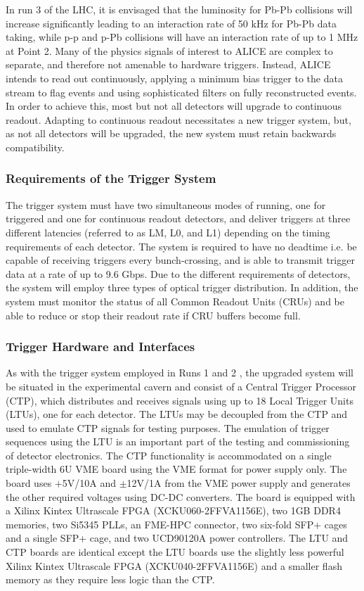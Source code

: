In run 3 of the LHC, it is envisaged that the luminosity for Pb-Pb collisions will increase significantly leading to an interaction rate of 50 kHz for Pb-Pb data taking, while p-p and p-Pb collisions will have an interaction rate of up to 1 MHz at Point 2. Many of the physics signals of interest to ALICE are complex to separate, and therefore not amenable to hardware triggers. Instead, ALICE intends to read out continuously, applying a minimum bias trigger to the data stream to flag events and using sophisticated filters on fully reconstructed events. In order to achieve this, most but not all detectors will upgrade to continuous readout. Adapting to continuous readout necessitates a new trigger system, but, as not all detectors will be upgraded, the new system must retain backwards compatibility.

\subsubsection{Requirements of the Trigger System}
The trigger system must have two simultaneous modes of running, one for triggered and one for continuous readout detectors, and deliver triggers at three different latencies (referred to as LM, L0, and L1) depending on the timing requirements of each detector. The system is required to have no deadtime i.e. be capable of receiving triggers every bunch-crossing, and is able to transmit trigger data at a rate of up to 9.6 Gbps. Due to the different requirements of detectors, the system will employ three types of optical trigger distribution. In addition, the system must monitor the status of all Common Readout Units (CRUs) and be able to reduce or stop their readout rate if CRU buffers become full.

\subsubsection{Trigger Hardware and Interfaces}
As with the trigger system employed in Runs 1 and 2 \cite{Aamodt:2008zz}, the upgraded system will be situated in the experimental cavern and consist of a Central Trigger Processor (CTP), which distributes and receives signals using up to 18 Local Trigger Units (LTUs), one for each detector. The LTUs may be decoupled from the CTP and used to emulate CTP signals for testing purposes. The emulation of trigger sequences using the LTU is an important part of the testing and commissioning of detector electronics. The CTP functionality is accommodated on a single triple-width 6U VME board using the VME format for power supply only. The board uses $+$5V/10A and $\pm$12V/1A from the VME power supply and generates the other required voltages using DC-DC converters. The board is equipped with a Xilinx Kintex Ultrascale FPGA (XCKU060-2FFVA1156E), two 1GB DDR4 memories, two Si5345 PLLs, an FME-HPC connector, two six-fold SFP+ cages and a single SFP+ cage, and two UCD90120A power controllers. The LTU and CTP boards are identical except the LTU boards use the slightly less powerful Xilinx Kintex Ultrascale FPGA (XCKU040-2FFVA1156E) and a smaller flash memory as they require less logic than the CTP.

